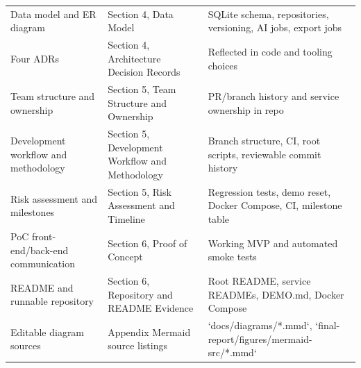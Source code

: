 \begin{longtable}{p{4.1cm}p{5.0cm}p{5.2cm}}
Data model and ER diagram & Section 4, Data Model & SQLite schema, repositories, versioning, AI jobs, export jobs \\
Four ADRs & Section 4, Architecture Decision Records & Reflected in code and tooling choices \\
Team structure and ownership & Section 5, Team Structure and Ownership & PR/branch history and service ownership in repo \\
Development workflow and methodology & Section 5, Development Workflow and Methodology & Branch structure, CI, root scripts, reviewable commit history \\
Risk assessment and milestones & Section 5, Risk Assessment and Timeline & Regression tests, demo reset, Docker Compose, CI, milestone table \\
PoC front-end/back-end communication & Section 6, Proof of Concept & Working MVP and automated smoke tests \\
README and runnable repository & Section 6, Repository and README Evidence & Root README, service READMEs, DEMO.md, Docker Compose \\
Editable diagram sources & Appendix Mermaid source listings & `docs/diagrams/*.mmd`, `final-report/figures/mermaid-src/*.mmd` \\
\bottomrule
\end{longtable}
